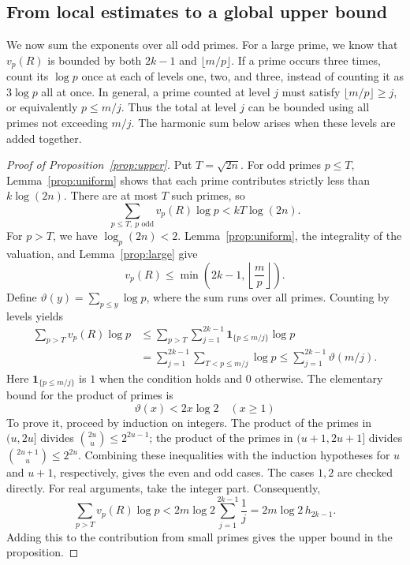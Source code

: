 \documentclass[11pt,a4paper]{article}
\numberwithin{equation}{section}
\theoremstyle{definition}
\begin{document}
\subsection{From local estimates to a global upper bound}

We now sum the exponents over all odd primes. For a large prime, we know that \(v_p(R)\) is bounded by both \(2k-1\) and \(\lfloor m/p\rfloor\). If a prime occurs three times, count its \(\log p\) once at each of levels one, two, and three, instead of counting it as \(3\log p\) all at once. In general, a prime counted at level \(j\) must satisfy \(\lfloor m/p\rfloor\ge j\), or equivalently \(p\le m/j\). Thus the total at level \(j\) can be bounded using all primes not exceeding \(m/j\). The harmonic sum below arises when these levels are added together.

\begin{proof}[Proof of Proposition~\ref{prop:upper}]
Put \(T=\sqrt{2n}\). For odd primes \(p\le T\), Lemma~\ref{prop:uniform} shows that each prime contributes strictly less than \(k\log(2n)\). There are at most \(T\) such primes, so
\begin{equation}
\sum_{p\le T,\ p\text{ odd}}v_p(R)\log p
<kT\log(2n).
\label{eq:old7.1}
\end{equation}
For \(p>T\), we have \(\log_p(2n)<2\). Lemma~\ref{prop:uniform}, the integrality of the valuation, and Lemma~\ref{prop:large} give
\[
v_p(R)\le\min\left(2k-1,\left\lfloor\frac mp\right\rfloor\right).
\]
Define \(\vartheta(y)=\sum_{p\le y}\log p\), where the sum runs over all primes. Counting by levels yields
\begin{align*}
\sum_{p>T}v_p(R)\log p
&\le\sum_{p>T}\sum_{j=1}^{2k-1}\mathbf1_{\{p\le m/j\}}\log p\\
&=\sum_{j=1}^{2k-1}\sum_{T<p\le m/j}\log p
\le\sum_{j=1}^{2k-1}\vartheta(m/j).
\end{align*}
Here \(\mathbf1_{\{p\le m/j\}}\) is \(1\) when the condition holds and \(0\) otherwise. The elementary bound for the product of primes is
\begin{equation}
\vartheta(x)<2x\log2\quad(x\ge1)
\label{eq:old7.2}
\end{equation}
To prove it, proceed by induction on integers. The product of the primes in \((u,2u]\) divides \(\binom{2u}{u}\le2^{2u-1}\); the product of the primes in \((u+1,2u+1]\) divides \(\binom{2u+1}{u}\le2^{2u}\). Combining these inequalities with the induction hypotheses for \(u\) and \(u+1\), respectively, gives the even and odd cases. The cases \(1,2\) are checked directly. For real arguments, take the integer part. Consequently,
\[
\sum_{p>T}v_p(R)\log p
<2m\log2\sum_{j=1}^{2k-1}\frac1j
=2m\log2\,h_{2k-1}.
\]
Adding this to the contribution from small primes gives the upper bound in the proposition.
\end{proof}
\end{document}
